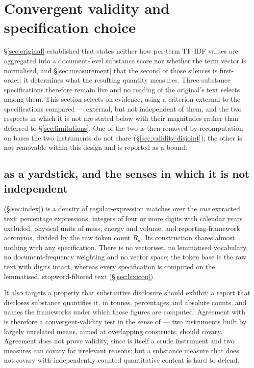 \section{Convergent validity and specification choice}
\label{sec:validity}

\S\ref{sec:original} established that \citet{lagasio2024} states neither how per-term
TF-IDF values are aggregated into a document-level substance score nor whether the term
vector is normalised, and \S\ref{sec:measurement} that the second of those silences is
first-order: it determines what the resulting quantity measures. Three substance
specifications therefore remain live and no reading of the original's text selects among
them. This section selects on evidence, using a criterion external to the specifications
compared --- external, but not independent of them, and the two respects in which it is
not are stated below with their magnitudes rather than deferred to
\S\ref{sec:limitations}. One of the two is then removed by recomputation on bases the two
instruments do not share (\S\ref{sec:validity-disjoint}); the other is not removable within
this design and is reported as a bound.

\subsection{\QUANT{} as a yardstick, and the senses in which it is not independent}

\QUANT{} (\S\ref{sec:index}) is a density of regular-expression matches over the
\emph{raw} extracted text: percentage expressions, integers of four or more digits with
calendar years excluded, physical units of mass, energy and volume, and reporting-framework
acronyms, divided by the raw token count $R_d$. Its construction shares almost nothing with
any \SUS{} specification. There is no vectoriser, no lemmatised vocabulary, no
document-frequency weighting and no vector space; the token base is the raw text with
digits intact, whereas every \SUS{} specification is computed on the lemmatised,
stopword-filtered text (\S\ref{sec:lexicon}).

It also targets a property that substantive disclosure should exhibit: a report that
discloses substance quantifies it, in tonnes, percentages and absolute counts, and names
the frameworks under which those figures are computed. Agreement with \QUANT{} is
therefore a convergent-validity test in the sense of \citet{campbell1959} --- two
instruments built by largely unrelated means, aimed at overlapping constructs, should
covary. Agreement does not prove validity, since \QUANT{} is itself a crude instrument and
two measures can covary for irrelevant reasons; but a substance measure that does not
covary with independently counted quantitative content is hard to defend.

